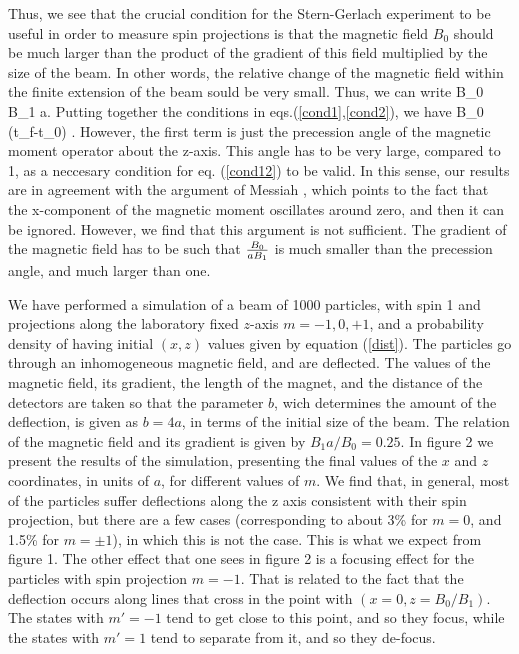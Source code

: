 Thus, we see that the crucial condition for the Stern-Gerlach experiment to
be useful in order to measure spin projections is that the magnetic field
$B_0$ should be much larger than the product of the gradient of this field
multiplied by the size of the beam. In other words, the relative change of 
the magnetic field within the finite extension of the beam sould be very small.
Thus, we can write
\be
B_0 \gg B_1 a.      \label{cond2}
\ee
Putting together the conditions in eqs.(\ref{cond1},\ref{cond2}), we have
\be
{B_0 (t_f-t_0) \over \hbar}  . \label{cond12}
\ee
However, the first term is just the precession angle of the magnetic moment
operator about the z-axis. This angle has to be very large, compared to 1,
as a neccesary condition for eq. (\ref{cond12}) to be valid. In this sense,
our results are in agreement with the argument of Messiah \cite{mes}, 
which points to the fact that the x-component of the magnetic moment 
oscillates around zero, and then it can be ignored. However, we find that this
argument is not sufficient. The gradient of the magnetic field has to be such 
that $B_0 \over a B_1$ is much smaller than the precession angle, and much 
larger than one.  

We have performed a simulation of a beam of 1000
particles, with spin 1 and projections along the laboratory fixed $z$-axis 
$m=-1,0,+1$,
and  a  probability density of having initial $(x,z)$ values 
given by equation (\ref{dist}).  The particles go through  an inhomogeneous 
magnetic field, and are deflected. The values of the magnetic field, 
its gradient, the length of the magnet, and the distance of the detectors are
taken so that the parameter $b$, wich determines the amount of the deflection, 
is given as $b=4a$, in terms of the initial size of the beam. 
The relation of the
magnetic field and its gradient is given by $B_1a/B_0=0.25$.
In figure 2 we present the results of the simulation, presenting the final 
values of the $x$ and $z$ coordinates, in units of $a$, for different values 
of $m$. We find that, in general, most of the particles suffer deflections
along the z axis consistent with their spin projection, but there are a few
cases (corresponding to about 3\% for $m=0$, and 1.5\% for $m=\pm1$), in which
this is not the case. This is what we expect from figure 1. The other effect
that one sees in figure 2 is a focusing effect for the particles with spin
projection $m=-1$. That is related to the fact that the deflection occurs
along lines that cross in the point with $(x=0, z=B_0/B_1)$.  The states with
$m'=-1$ tend to get close to this point, and so they focus, while the states
with $m'=1$ tend to separate from it, and so they de-focus.
    
